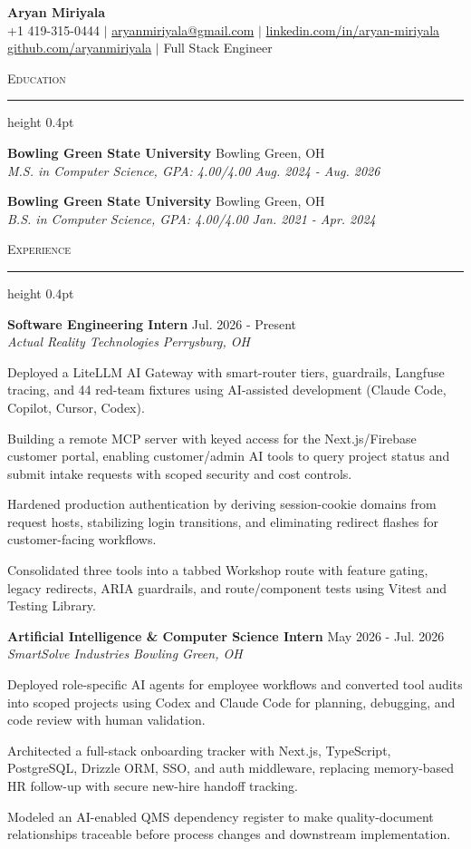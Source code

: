 \documentclass[letterpaper,11pt]{article}
\newcommand{\resumesection}[1]{%
  \par\vspace{2pt}%
  {\large\scshape #1}\par\vspace{2pt}%
  \hrule height 0.4pt\vspace{2pt}%
}
\newcommand{\resumeSubheading}[4]{
  \textbf{#1} \hfill #2\\
  \textit{#3} \hfill \textit{#4}
}
\begin{document}
\begin{center}
  {\LARGE \textbf{Aryan Miriyala}}\\[2pt]
  \small
  +1 419-315-0444 $|$ \href{mailto:aryanmiriyala@gmail.com}{aryanmiriyala@gmail.com} $|$ \href{https://www.linkedin.com/in/aryan-miriyala-7788a21b6/}{linkedin.com/in/aryan-miriyala}\\
  \href{https://github.com/aryanmiriyala}{github.com/aryanmiriyala} $|$ Full Stack Engineer
\end{center}\vspace{-6pt}

\resumesection{Education}
\resumeSubheading
{Bowling Green State University}{Bowling Green, OH}
{M.S. in Computer Science, GPA: 4.00/4.00}{Aug. 2024 - Aug. 2026}

\resumeSubheading
{Bowling Green State University}{Bowling Green, OH}
{B.S. in Computer Science, GPA: 4.00/4.00}{Jan. 2021 - Apr. 2024}

\resumesection{Experience}
\resumeSubheading
{Software Engineering Intern}{Jul. 2026 - Present}
{Actual Reality Technologies}{Perrysburg, OH}
\begin{tightitemize}
  \item Deployed a LiteLLM AI Gateway with smart-router tiers, guardrails, Langfuse tracing, and 44 red-team fixtures using AI-assisted development (Claude Code, Copilot, Cursor, Codex).
  \item Building a remote MCP server with keyed access for the Next.js/Firebase customer portal, enabling customer/admin AI tools to query project status and submit intake requests with scoped security and cost controls.
  \item Hardened production authentication by deriving session-cookie domains from request hosts, stabilizing login transitions, and eliminating redirect flashes for customer-facing workflows.
  \item Consolidated three tools into a tabbed Workshop route with feature gating, legacy redirects, ARIA guardrails, and route/component tests using Vitest and Testing Library.
\end{tightitemize}

\resumeSubheading
{Artificial Intelligence \& Computer Science Intern}{May 2026 - Jul. 2026}
{SmartSolve Industries}{Bowling Green, OH}
\begin{tightitemize}
  \item Deployed role-specific AI agents for employee workflows and converted tool audits into scoped projects using Codex and Claude Code for planning, debugging, and code review with human validation.
  \item Architected a full-stack onboarding tracker with Next.js, TypeScript, PostgreSQL, Drizzle ORM, SSO, and auth middleware, replacing memory-based HR follow-up with secure new-hire handoff tracking.
  \item Modeled an AI-enabled QMS dependency register to make quality-document relationships traceable before process changes and downstream implementation.
\end{tightitemize}
\end{document}
